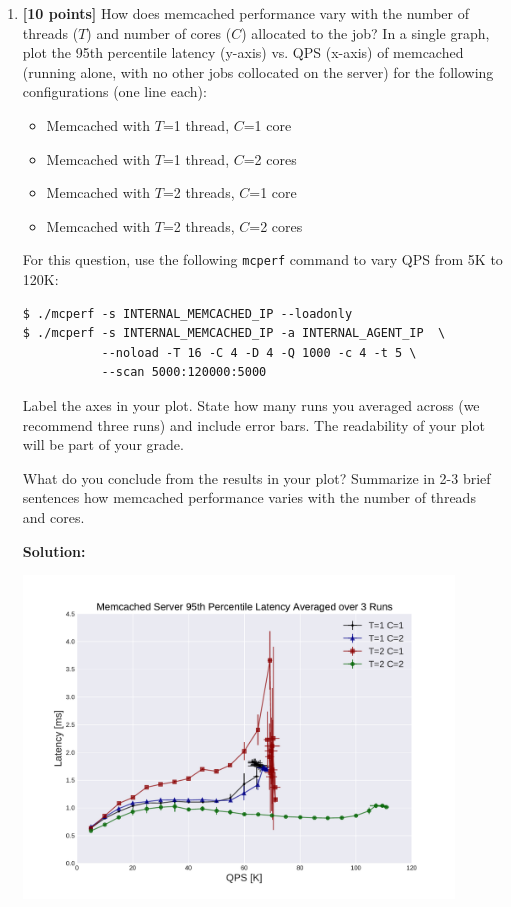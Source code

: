 \documentclass[11pt]{article}
\begin{document}
\begin{enumerate}
\itemsep 2em
    \item \textbf{[10 points]} How does memcached performance vary with the number of threads ($T$) and number of cores ($C$) allocated to the job? In a single graph, plot the 95th percentile latency (y-axis) vs. QPS (x-axis) of memcached (running alone, with no other jobs collocated on the server) for the following configurations (one line each):
    \begin{itemize}
        \item Memcached with $T$=1 thread, $C$=1 core
        \item Memcached with $T$=1 thread, $C$=2 cores
        \item Memcached with $T$=2 threads, $C$=1 core
        \item Memcached with $T$=2 threads, $C$=2 cores
    \end{itemize}
    
    For this question, use the following \texttt{mcperf} command to vary QPS from 5K to 120K: 
    \begin{Verbatim}[fontsize=\small]
$ ./mcperf -s INTERNAL_MEMCACHED_IP --loadonly 
$ ./mcperf -s INTERNAL_MEMCACHED_IP -a INTERNAL_AGENT_IP  \
           --noload -T 16 -C 4 -D 4 -Q 1000 -c 4 -t 5 \ 
           --scan 5000:120000:5000
\end{Verbatim}

    Label the axes in your plot. State how many runs you averaged across (we recommend three runs) and include error bars. The readability of your plot will be part of your grade.
    
    What do you conclude from the results in your plot? Summarize in 2-3 brief sentences how memcached performance varies with the number of threads and cores. 
    
    \textbf{Solution:}
    
    \begin{center}
    {\includegraphics[width=0.9\textwidth]{p95.pdf}}
    \end{center}
    

\end{enumerate}
\end{document}
